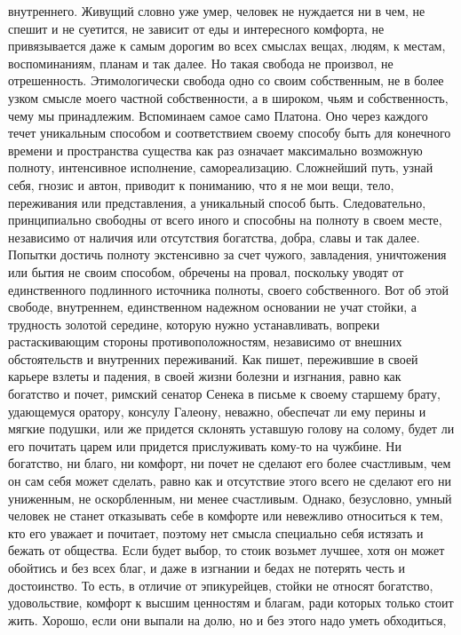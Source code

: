 внутреннего. Живущий словно уже умер, человек не нуждается ни в чем, не спешит и
не суетится, не зависит от еды и интересного комфорта, не привязывается даже к
самым дорогим во всех смыслах вещах, людям, к местам, воспоминаниям, планам и
так далее. Но такая свобода не произвол, не отрешенность. Этимологически свобода
одно со своим собственным, не в более узком смысле моего частной собственности,
а в широком, чьям и собственность, чему мы принадлежим. Вспоминаем самое само
Платона. Оно через каждого течет уникальным способом и соответствием своему
способу быть для конечного времени и пространства существа как раз означает
максимально возможную полноту, интенсивное исполнение, самореализацию.
Сложнейший путь, узнай себя, гнозис и автон, приводит к пониманию, что я не мои
вещи, тело, переживания или представления, а уникальный способ быть.
Следовательно, принципиально свободны от всего иного и способны на полноту в
своем месте, независимо от наличия или отсутствия богатства, добра, славы и так
далее. Попытки достичь полноту экстенсивно за счет чужого, завладения,
уничтожения или бытия не своим способом, обречены на провал, поскольку уводят от
единственного подлинного источника полноты, своего собственного. Вот об этой
свободе, внутреннем, единственном надежном основании не учат стойки, а трудность
золотой середине, которую нужно устанавливать, вопреки растаскивающим стороны
противоположностям, независимо от внешних обстоятельств и внутренних
переживаний. Как пишет, пережившие в своей карьере взлеты и падения, в своей
жизни болезни и изгнания, равно как богатство и почет, римский сенатор Сенека в
письме к своему старшему брату, удающемуся оратору, консулу Галеону, неважно,
обеспечат ли ему перины и мягкие подушки, или же придется склонять уставшую
голову на солому, будет ли его почитать царем или придется прислуживать кому-то
на чужбине. Ни богатство, ни благо, ни комфорт, ни почет не сделают его более
счастливым, чем он сам себя может сделать, равно как и отсутствие этого всего не
сделают его ни униженным, не оскорбленным, ни менее счастливым. Однако,
безусловно, умный человек не станет отказывать себе в комфорте или невежливо
относиться к тем, кто его уважает и почитает, поэтому нет смысла специально себя
истязать и бежать от общества. Если будет выбор, то стоик возьмет лучшее, хотя
он может обойтись и без всех благ, и даже в изгнании и бедах не потерять честь и
достоинство. То есть, в отличие от эпикурейцев, стойки не относят богатство,
удовольствие, комфорт к высшим ценностям и благам, ради которых только стоит
жить. Хорошо, если они выпали на долю, но и без этого надо уметь обходиться,
